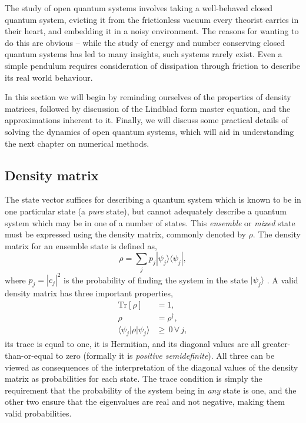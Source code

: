 The study of open quantum systems involves taking a well-behaved closed quantum system, evicting it from the frictionless vacuum every theorist carries in their heart, and embedding it in a noisy environment. The reasons for wanting to do this are obvious -- while the study of energy and number conserving closed quantum systems has led to many insights, such systems rarely exist. Even a simple pendulum requires consideration of dissipation through friction to describe its real world behaviour.

In this section we will begin by reminding ourselves of the properties of density matrices, followed by discussion of the Lindblad form master equation, and the approximations inherent to it. Finally, we will discuss some practical details of solving the dynamics of open quantum systems, which will aid in understanding the next chapter on numerical methods.

\subsection{Density matrix}
The state vector suffices for describing a quantum system which is known to be in one particular state (a \emph{pure} state), but cannot adequately describe a quantum system which may be in one of a number of states. This \emph{ensemble} or \emph{mixed} state must be expressed using the density matrix, commonly denoted by \(\rho\). The density matrix for an ensemble state is defined as,
\begin{equation}
	\rho = \sum_{j} p_{j} |\psi_{j} \rangle \langle \psi_{j}|,
	\label{eq:oqs2-1}
\end{equation}
where \(p_{j} = |c_{j}|^{2}\) is the probability of finding the system in the state \(|\psi_{j}\rangle\) \cite{NielsenChuang_DM}. A valid density matrix has three important properties,
\begin{align}
	\mathrm{Tr}[\rho] &= 1, \label{eq:oqs2-2} \\
	\rho &= \rho^{\dagger}, \label{eq:oqs2-3} \\
	\langle \psi_{j}| \rho | \psi_{j} \rangle &\geq \, 0 \, \forall \, j, \label{eq:oqs2-4}
\end{align}
its trace is equal to one, it is Hermitian, and its diagonal values are all greater-than-or-equal to zero (formally it is \emph{positive semidefinite}). All three can be viewed as consequences of the interpretation of the diagonal values of the density matrix as probabilities for each state. The trace condition is simply the requirement that the probability of the system being in \emph{any} state is one, and the other two ensure that the eigenvalues are real and not negative, making them valid probabilities.

